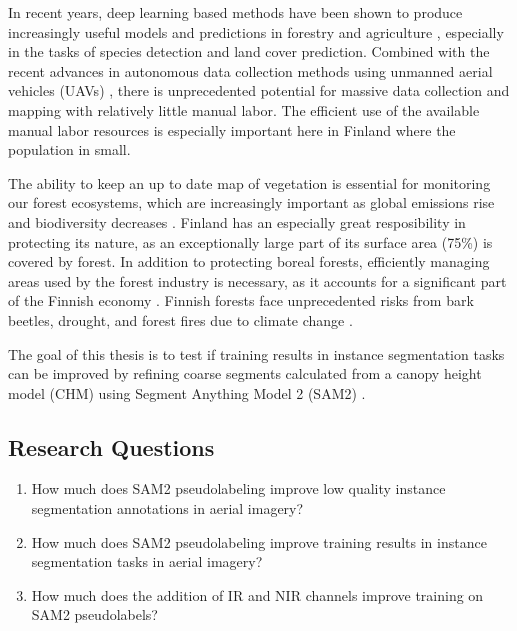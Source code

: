 \documentclass[english, 12pt, a4paper, sci, utf8, a-2b, online]{aaltothesis}
\begin{document}
In recent years, deep learning based methods have been shown to produce increasingly useful models and predictions in forestry and agriculture \cite{dl-forestry}, especially in the tasks of species detection and land cover prediction. Combined with the recent advances in autonomous data collection methods using unmanned aerial vehicles (UAVs) \cite{uav-data-collection}, there is unprecedented potential for massive data collection and mapping with relatively little manual labor. The efficient use of the available manual labor resources is especially important here in Finland where the population in small.

The ability to keep an up to date map of vegetation is essential for monitoring our forest ecosystems, which are increasingly important as global emissions rise and biodiversity decreases \cite{natural-resources-finland}. Finland has an especially great resposibility in protecting its nature, as an exceptionally large part of its surface area (75\%) is covered by forest. In addition to protecting boreal forests, efficiently managing areas used by the forest industry is necessary, as it accounts for a significant part of the Finnish economy \cite{forest-industry-economy}. Finnish forests face unprecedented risks from bark beetles, drought, and forest fires due to climate change \cite{climate-change-finland-forestry}.

The goal of this thesis is to test if training results in instance segmentation tasks can be improved by refining coarse segments calculated from a canopy height model (CHM) using Segment Anything Model 2 (SAM2) \cite{sam2}.

\subsection{Research Questions}

\begin{enumerate}
\item How much does SAM2 pseudolabeling improve low quality instance segmentation annotations in aerial imagery?
\item How much does SAM2 pseudolabeling improve training results in instance segmentation tasks in aerial imagery?
\item How much does the addition of IR and NIR channels improve training on SAM2 pseudolabels?
\end{enumerate}
\end{document}

